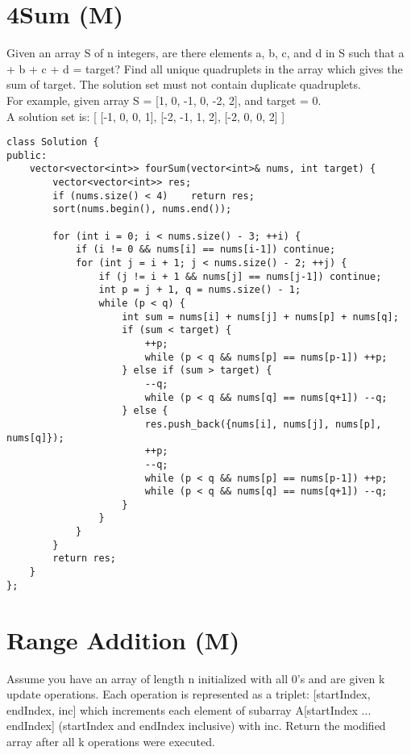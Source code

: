 \section{4Sum (M)}
Given an array S of n integers, are there elements a, b, c, and d in S such that a + b + c + d = target? Find all unique quadruplets in the array which gives the sum of target. The solution set must not contain duplicate quadruplets.\\

For example, given array S = [1, 0, -1, 0, -2, 2], and target = 0.\\
A solution set is:
[
  [-1,  0, 0, 1],
  [-2, -1, 1, 2],
  [-2,  0, 0, 2]
]\\

\begin{lstlisting}
class Solution {
public:
    vector<vector<int>> fourSum(vector<int>& nums, int target) {
        vector<vector<int>> res;
        if (nums.size() < 4)    return res;  
        sort(nums.begin(), nums.end());
        
        for (int i = 0; i < nums.size() - 3; ++i) {
            if (i != 0 && nums[i] == nums[i-1]) continue;
            for (int j = i + 1; j < nums.size() - 2; ++j) {
                if (j != i + 1 && nums[j] == nums[j-1]) continue;
                int p = j + 1, q = nums.size() - 1;
                while (p < q) {
                    int sum = nums[i] + nums[j] + nums[p] + nums[q];
                    if (sum < target) {
                        ++p;
                        while (p < q && nums[p] == nums[p-1]) ++p;
                    } else if (sum > target) {
                        --q;
                        while (p < q && nums[q] == nums[q+1]) --q;
                    } else {
                        res.push_back({nums[i], nums[j], nums[p], nums[q]});
                        ++p;
                        --q;
                        while (p < q && nums[p] == nums[p-1]) ++p;
                        while (p < q && nums[q] == nums[q+1]) --q;
                    }
                }
            }
        }
        return res;
    }
};
\end{lstlisting}


\section{Range Addition (M)}
Assume you have an array of length n initialized with all 0's and are given k update operations. Each operation is represented as a triplet: [startIndex, endIndex, inc] which increments each element of subarray A[startIndex ... endIndex] (startIndex and endIndex inclusive) with inc. Return the modified array after all k operations were executed.\\

